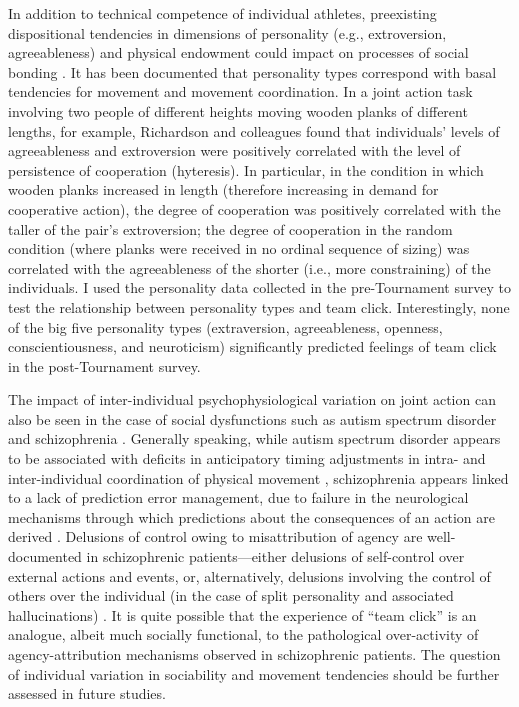 \begin{landscape}
  In addition to technical competence of individual athletes, preexisting dispositional tendencies in dimensions of personality (e.g., extroversion, agreeableness) and physical endowment could impact on processes of social bonding \citep{Marsh2009,VonRueden2015}.   It has been documented that personality types correspond with basal tendencies for movement and movement coordination. In a joint action task involving two people of different heights moving wooden planks of different lengths, for example, Richardson and colleagues \textcite{Richardson2007} found that individuals’ levels of agreeableness and extroversion were positively correlated with the level of persistence of cooperation (hyteresis).  In particular, in the condition in which wooden planks increased in length (therefore increasing in demand for cooperative action), the degree of cooperation was positively correlated with the taller of the pair’s extroversion; the degree of cooperation in the random condition (where planks were received in no ordinal sequence of sizing) was correlated with the agreeableness of the shorter (i.e., more constraining) of the individuals.  I used the personality data collected in the pre-Tournament survey to test the relationship between personality types and team click. Interestingly, none of the big five personality types (extraversion, agreeableness, openness, conscientiousness, and neuroticism) significantly predicted feelings of team click in the post-Tournament survey.

  The impact of inter-individual psychophysiological variation on joint action can also be seen in the case of social dysfunctions such as autism spectrum disorder \citep{Isenhower2012} and schizophrenia \citep{Varlet2012}.  Generally speaking,  while autism spectrum disorder appears to be associated with deficits in anticipatory timing adjustments in intra- and inter-individual coordination of physical movement \citep{Martineau2010}, schizophrenia appears linked to a lack of prediction error management, due to failure in the neurological mechanisms through which predictions about the consequences of an action are derived \citep{Frith2000}.  Delusions of control owing to misattribution of agency are well-documented in schizophrenic patients---either delusions of self-control over external actions and events, or, alternatively, delusions involving the control of others over the individual (in the case of split personality and associated hallucinations) \citep{Frith2007}. It is quite possible that the experience of ``team click'' is an analogue, albeit much socially functional, to the pathological over-activity of agency-attribution mechanisms observed in schizophrenic patients.  The question of individual variation in sociability and movement tendencies should be further assessed in future studies.


\end{landscape}
